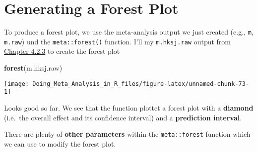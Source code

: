 \documentclass[]{book}
\newenvironment{Shaded}{\begin{snugshade}}{\end{snugshade}}
\newcommand{\KeywordTok}[1]{\textcolor[rgb]{0.13,0.29,0.53}{\textbf{#1}}}
\newcommand{\NormalTok}[1]{#1}
\theoremstyle{definition}
\theoremstyle{definition}
\theoremstyle{definition}
\theoremstyle{remark}
\begin{document}
\section{Generating a Forest Plot}\label{generating-a-forest-plot}

To produce a forest plot, we use the meta-analysis output we just
created (e.g., \texttt{m}, \texttt{m.raw}) und the
\texttt{meta::forest()} function. I'll my \texttt{m.hksj.raw} output
from \protect\hyperlink{random.raw}{Chapter 4.2.3} to create the forest
plot

\begin{Shaded}
\begin{Highlighting}[]
\KeywordTok{forest}\NormalTok{(m.hksj.raw)}
\end{Highlighting}
\end{Shaded}

\begin{center}\texttt{[image: Doing\_Meta\_Analysis\_in\_R\_files/figure-latex/unnamed-chunk-73-1]} \end{center}

Looks good so far. We see that the function plottet a forest plot with a
\textbf{diamond} (i.e.~the overall effect and its confidence interval)
and a \textbf{prediction interval}.

There are plenty of \textbf{other parameters} within the
\texttt{meta::forest} function which we can use to modify the forest
plot.
\end{document}
